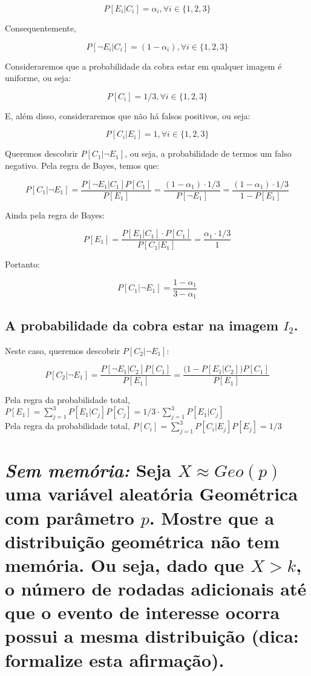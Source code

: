 \documentclass[a4paper]{article}
\begin{document}
$$P[E_i|C_i] = \alpha_i, \forall i \in \{1,2,3\}$$ 

Consequentemente, 

$$P[\neg E_i|C_i] = (1-\alpha_i), \forall i \in \{1,2,3\}$$ 

Consideraremos que a probabilidade da cobra estar em qualquer imagem é uniforme, ou seja: 

$$P[C_i] = 1/3, \forall i \in \{1,2,3\}$$

E, além disso, consideraremos que não há falsos positivos, ou seja: 

$$P[C_i|E_i] = 1, \forall i \in \{1,2,3\}$$

Queremos descobrir $P[C_1|\neg E_1]$, ou seja, a probabilidade de termos um falso negativo. Pela regra de Bayes, temos que: 

$$P[C_1|\neg E_1] = \frac{P[\neg E_1|C_1]P[C_1]}{P[E_1]} = \frac{(1-\alpha_1)\cdot 1/3}{P[\neg E_1]} = \frac{(1-\alpha_1)\cdot 1/3}{1- P[E_1]}$$

Ainda pela regra de Bayes: 

$$P[E_1] = \frac{P[E_1|C_1]\cdot P[C_1]}{P[C_1|E_1]} = \frac{\alpha_1 \cdot 1/3}{1}$$

Portanto: 

$$P[C_1|\neg E_1] = \frac{1-\alpha_1}{3-\alpha_1}$$



\subsection{A probabilidade da cobra estar na imagem $I_2$.}

Neste caso, queremos descobrir $P[C_2|\neg E_1]$:

$$P[C_2|\neg E_1] = \frac{P[\neg E_1|C_2]P[C_1]}{P[E_1]} = \frac{\Big(1-P[E_1|C_2]\Big)P[C_1]}{P[E_1]}$$

Pela regra da probabilidade total, $P[E_1] = \sum_{j=1}^3 P[E_1|C_j]P[C_j] = 1/3\cdot \sum_{j=1}^3 P[E_1|C_j]$\\


Pela regra da probabilidade total, $P[C_i] = \sum_{j=1}^3 P[C_i|E_j]P[E_j] = 1/3$


\section{\textit{Sem memória: } Seja $X \approx Geo(p)$ uma variável aleatória Geométrica com parâmetro $p$. Mostre que a distribuição geométrica não tem memória. Ou seja, dado que $X > k$, o número de rodadas adicionais até que o evento de interesse ocorra possui a mesma distribuição (dica: formalize esta afirmação).}\\
\end{document}
